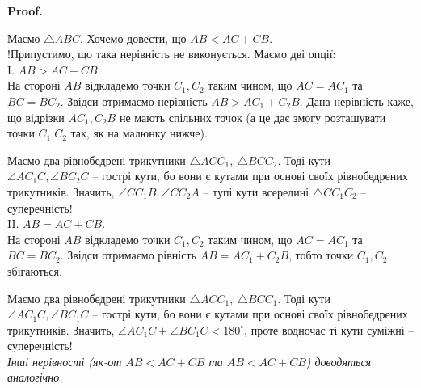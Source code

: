 \documentclass[a4paper, 10pt]{article}
\makeatletter
\theoremstyle{theoremdd}
\theoremstyle{theoremdd}
\theoremstyle{theoremdd}
\theoremstyle{theoremdd}
\theoremstyle{theoremdd}
\theoremstyle{theoremdd}
\theoremstyle{theoremdd}
\theoremstyle{theoremdd}
\theoremstyle{theoremdd}
\renewenvironment{proof}[1][Proof.\\]{\par
\pushQED{\hfill \qed}%
\normalfont \topsep6\p@\@plus6\p@\relax
\trivlist
\item\relax
{\bfseries
#1\@addpunct{.}}\hspace\labelsep\ignorespaces
}{%
\popQED\endtrivlist\@endpefalse
}
\makeatother
\begin{document}
\begin{proof}
Маємо $\triangle ABC$. Хочемо довести, що $AB < AC + CB$.\\
!Припустимо, що така нерівність не виконується. Маємо дві опції:
\bigskip \\
I. \textit{$AB > AC + CB$}.\\
На стороні $AB$ відкладемо точки $C_1,C_2$ таким чином, що $AC = AC_1$ та $BC = BC_2$. Звідси отримаємо нерівність $AB > AC_1 + C_2B$. Дана нерівність каже, що відрізки $AC_1,C_2B$ не мають спільних точок (а це дає змогу розташувати точки $C_1$,$C_2$ так, як на малюнку нижче).
\begin{figure}[H]
\centering
{}
\end{figure}
Маємо два рівнобедрені трикутники $\triangle ACC_1,\ \triangle BCC_2$. Тоді кути $\angle AC_1C,\angle BC_2C$ -- гострі кути, бо вони є кутами при основі своїх рівнобедрених трикутників. Значить, $\angle CC_1B, \angle CC_2A$ -- тупі кути всередині $\triangle CC_1C_2$ -- суперечність!
\bigskip \\
II. \textit{$AB = AC + CB$}.\\
На стороні $AB$ відкладемо точки $C_1,C_2$ таким чином, що $AC = AC_1$ та $BC = BC_2$. Звідси отримаємо рівність $AB = AC_1 + C_2B$, тобто точки $C_1,C_2$ збігаються.
\begin{figure}[H]
\centering
{}
\end{figure}
Маємо два рівнобедрені трикутники $\triangle ACC_1,\ \triangle BCC_1$. Тоді кути $\angle AC_1C,\angle BC_1C$ -- гострі кути, бо вони є кутами при основі своїх рівнобедрених трикутників. Значить, $\angle AC_1C + \angle BC_1C < 180^\circ$, проте водночас ті кути суміжні -- суперечність! \qedhere
\\
\textit{Інші нерівності (як-от $AB < AC + CB$ та $AB < AC + CB$) доводяться аналогічно.}
\end{proof}
\end{document}
